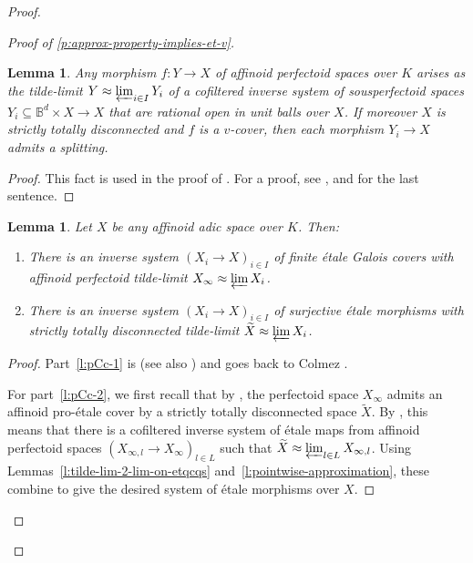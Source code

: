 \documentclass[11pt]{amsart}
\numberwithin{equation}{section}
\newtheorem{Lemma}[thm]{Lemma}
\theoremstyle{definition}
\theoremstyle{remark}
\newcommand{\B}{\mathbb{B}}
\newcommand{\wt}{\widetilde}
\begin{document}
\begin{proof}
\begin{proof}[Proof of \cref{p:approx-property-implies-et-v}]
                \begin{Lemma}\label{l:v-cover-approximate-by-balls}
			 Any morphism $f\colon Y\to X$ of affinoid perfectoid spaces over $K$ arises as the tilde-limit $Y\approx\varprojlim_{i\in I} Y_i$ of a cofiltered inverse system of sousperfectoid spaces $Y_i\subseteq \B^{d}\times X\to X$ that are rational open in unit balls over $X$. If moreover $X$ is strictly totally disconnected and $f$ is a $v$-cover, then each morphism $Y_i\to X$ admits a splitting.
		\end{Lemma}

                \begin{proof}
			This fact is used in the proof of \cite[Proposition 14.7]{etale-cohomology-of-diamonds}. For a proof, see \cite[Proposition~3.17]{heuer-diamantine-Picard}, and \cite[Lemma~2.23]{heuer-Picard-good-reduction} for the last sentence.
		\end{proof}

                \begin{Lemma}\label{l:proet-Colmez-cover}
		Let $X$ be any affinoid adic space over $K$. Then:
		\begin{enumerate}
			\item\label{l:pCc-1} There is an inverse system $(X_i\to X)_{i\in I}$ of finite \'etale Galois covers with affinoid perfectoid tilde-limit $X_\infty\approx \varprojlim X_i$. 
			\item\label{l:pCc-2} There is an inverse system $(X_i\to X)_{i\in I}$ of surjective \'etale morphisms with strictly totally disconnected tilde-limit $\wt X\approx \varprojlim X_i$.
		\end{enumerate}
		
		\end{Lemma}

                \begin{proof}
		Part~\eqref{l:pCc-1} is \cite[Lemma 10.1.6--7]{ScholzeWeinstein} (see also \cite[Lemma 15.3, Proposition 15.4]{etale-cohomology-of-diamonds}) and goes back to Colmez \cite[Section~4]{Colmez-espacesdeBanach}. 
		
		For part~\eqref{l:pCc-2}, we first recall that by \cite[Lemma 7.18]{etale-cohomology-of-diamonds}, the perfectoid space $X_\infty$ admits an affinoid pro-\'etale cover by a strictly totally disconnected space $\wt X$. By  \cite[Proposition~6.5]{etale-cohomology-of-diamonds}, this means that there is a cofiltered inverse system of  \'etale maps from affinoid perfectoid spaces $(X_{\infty,l}\to X_\infty)_{l\in L}$ such that $\wt X\approx \varprojlim_{l\in L} X_{\infty,l}$. Using Lemmas~\ref{l:tilde-lim-2-lim-on-etqcqs} and~\ref{l:pointwise-approximation}, these combine to give the desired system of \'etale morphisms over $X$. 
	        \end{proof}
                

\end{proof}
\end{proof}
\end{document}
